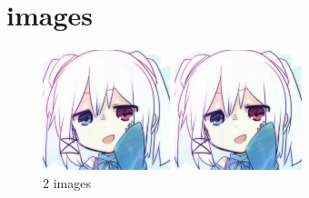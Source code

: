 \documentclass[11pt,a4paper]{book}
\begin{document}
\chapter{images}
\begin{figure}
  \begin{minipage}[b]{0.45\linewidth}
    \centering
    \includegraphics[natwidth=\linewidth,natheight=0.5\linewidth,scale=1]{head_image.jpg}
  \end{minipage}
  \begin{minipage}[b]{0.45\linewidth}
    \centering
    \includegraphics[natwidth=\linewidth,natheight=0.5\linewidth,scale=1]{head_image.jpg}
  \end{minipage}
  \label{fig:2img}
  \caption{2 images}
\end{figure}
\end{document}
